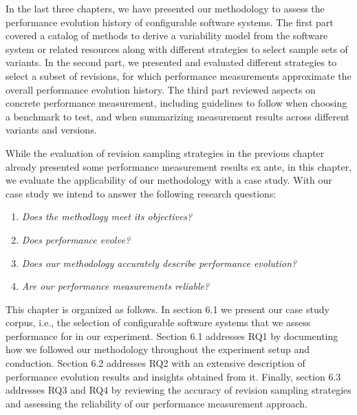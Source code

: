 In the last three chapters, we have presented our methodology to assess the
performance evolution history of configurable software systems. The first part
covered a catalog of methods to derive a variability model from the software
system or related resources along with different strategies to select sample
sets of variants. In the second part, we presented and evaluated different
strategies to select a subset of revisions, for which performance measurements
approximate the overall performance evolution history. The third part reviewed
aspects on concrete performance measurement, including guidelines to follow when choosing
a benchmark to test, and when summarizing measurement results across different
variants and versions.

While the evaluation of revision sampling strategies in the previous chapter
already presented some performance measurement results ex ante, in this chapter, we
evaluate the applicability of our methodology with a case study. With our case
study we intend to answer the following research questions:

\begin{enumerate}[RQ1)]
  \item \emph{Does the methodlogy meet its objectives?}
  \item \emph{Does performance evolve?}
  \item \emph{Does our methodology accurately describe performance evolution?}
  \item \emph{Are our performance measurements reliable?}
\end{enumerate}

{\color{red}This chapter is organized as follows. In section 6.1 we present our
case study corpus, i.e., the selection of configurable software systems that we
assess performance for in our experiment. Section 6.1 addresses RQ1 by
documenting how we followed our methodology throughout the experiment setup and
conduction. Section 6.2 addresses RQ2  with an extensive description of
performance evolution results and insights obtained from it. Finally, section
6.3 addresses RQ3 and RQ4 by reviewing the accuracy of revision sampling
strategies and assessing the reliability of our performance measurement
approach.
}

